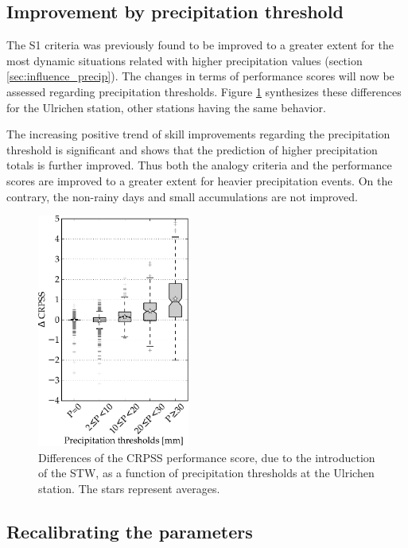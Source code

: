 \documentclass[hess]{copernicus}
\begin{document}
\subsection{Improvement by precipitation threshold}
\label{sec:improvement_CRPSS_precip_threshold}

The S1 criteria was previously found to be improved to a greater extent for the most dynamic situations related with higher precipitation values (section \ref{sec:influence_precip}). The changes in terms of performance scores will now be assessed regarding precipitation thresholds. Figure \ref{fig:changes_CRPS_precip_threshold} synthesizes these differences for the Ulrichen station, other stations having the same behavior.

The increasing positive trend of skill improvements regarding the precipitation threshold is significant and shows that the prediction of higher precipitation totals is further improved. Thus both the analogy criteria and the performance scores are improved to a greater extent for heavier precipitation events. On the contrary, the non-rainy days and small accumulations are not improved.

\begin{figure}[htb]
	\includegraphics[width=5cm]{figures/changes_CRPS_precip_threshold.pdf}
	\caption{Differences of the CRPSS performance score, due to the introduction of the STW, as a function of precipitation thresholds at the Ulrichen station. The stars represent averages.}
	\label{fig:changes_CRPS_precip_threshold}
\end{figure}


\subsection{Recalibrating the parameters}
\label{sec:recalibration}
\end{document}
